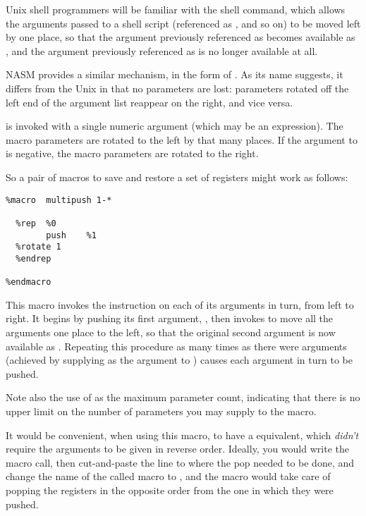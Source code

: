 
Unix shell programmers will be familiar with the  shell command, which allows the arguments passed
to a shell script (referenced as ,  and so on) to be
moved left by one place, so that the argument previously referenced
as  becomes available as , and the argument previously
referenced as  is no longer available at all.

NASM provides a similar mechanism, in the form of . As
its name suggests, it differs from the Unix  in that no
parameters are lost: parameters rotated off the left end of the
argument list reappear on the right, and vice versa.

 is invoked with a single numeric argument (which may be
an expression). The macro parameters are rotated to the left by that
many places. If the argument to  is negative, the macro
parameters are rotated to the right.

So a pair of macros to save and
restore a set of registers might work as follows:

\begin{lstlisting}
%macro  multipush 1-*

  %rep  %0
        push    %1
  %rotate 1
  %endrep

%endmacro
\end{lstlisting}

This macro invokes the  instruction on each of its arguments
in turn, from left to right. It begins by pushing its first
argument, , then invokes  to move all the arguments
one place to the left, so that the original second argument is now
available as . Repeating this procedure as many times as there
were arguments (achieved by supplying  as the argument to
) causes each argument in turn to be pushed.

Note also the use of \code{*} as the maximum parameter count,
indicating that there is no upper limit on the number of parameters
you may supply to the  macro.

It would be convenient, when using this macro, to have a 
equivalent, which \emph{didn't} require the arguments to be given in
reverse order. Ideally, you would write the  macro
call, then cut-and-paste the line to where the pop needed to be
done, and change the name of the called macro to , and
the macro would take care of popping the registers in the opposite
order from the one in which they were pushed.

